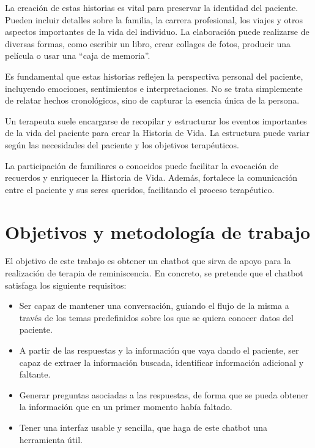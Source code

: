 La creación de estas historias es vital para preservar la identidad del paciente. Pueden incluir detalles sobre la familia, la carrera profesional, los viajes y otros aspectos importantes de la vida del individuo. La elaboración puede realizarse de diversas formas, como escribir un libro, crear collages de fotos, producir una película o usar una ``caja de memoria''.

Es fundamental que estas historias reflejen la perspectiva personal del paciente, incluyendo emociones, sentimientos e interpretaciones. No se trata simplemente de relatar hechos cronológicos, sino de capturar la esencia única de la persona.

Un terapeuta suele encargarse de recopilar y estructurar los eventos importantes de la vida del paciente para crear la Historia de Vida. La estructura puede variar según las necesidades del paciente y los objetivos terapéuticos.

La participación de familiares o conocidos puede facilitar la evocación de recuerdos y enriquecer la Historia de Vida. Además, fortalece la comunicación entre el paciente y sus seres queridos, facilitando el proceso terapéutico.

\section{Objetivos y metodología de trabajo}
\label{sec:objetivos}

El objetivo de este trabajo es obtener un chatbot que sirva de apoyo para la realización de terapia de reminiscencia. En concreto, se pretende que el chatbot satisfaga los siguiente requisitos: 

\begin{itemize}
	\item  Ser capaz de mantener una conversación, guiando el flujo de la misma a través de los temas predefinidos sobre los que se quiera conocer datos del paciente. 
	\item A partir de las respuestas y la información que vaya dando el paciente, ser capaz de extraer la información buscada, identificar información adicional y faltante. 
	\item Generar preguntas asociadas a las respuestas, de forma que se pueda obtener la información que en un primer momento había faltado. 
	\item Tener una interfaz usable y sencilla, que haga de este chatbot una herramienta útil.
\end{itemize}

